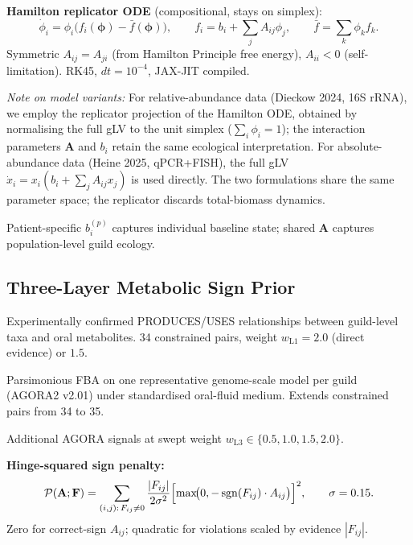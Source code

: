 \documentclass[10pt,a4paper]{article}
\newcommand{\bphi}{\boldsymbol{\phi}}
\newcommand{\bA}{\mathbf{A}}
\begin{document}
\textbf{Hamilton replicator ODE} (compositional, stays on simplex):
\begin{equation}
  \dot\phi_i = \phi_i\bigl(f_i(\bphi) - \bar f(\bphi)\bigr),
  \qquad f_i = b_i + \textstyle\sum_j A_{ij}\phi_j,
  \qquad \bar f = \textstyle\sum_k \phi_k f_k.
\end{equation}
Symmetric $A_{ij}=A_{ji}$ (from Hamilton Principle free energy),
$A_{ii}<0$ (self-limitation). RK45, $dt=10^{-4}$, JAX-JIT compiled.

\textit{Note on model variants:} For relative-abundance data (Dieckow 2024, 16S rRNA),
we employ the replicator projection of the Hamilton ODE, obtained by normalising the
full gLV to the unit simplex ($\sum_i\phi_i=1$); the interaction parameters $\bA$ and
$b_i$ retain the same ecological interpretation.
For absolute-abundance data (Heine 2025, qPCR+FISH), the full gLV
$\dot x_i = x_i(b_i+\sum_j A_{ij}x_j)$ is used directly.
The two formulations share the same parameter space; the replicator discards total-biomass dynamics.

Patient-specific $b_i^{(p)}$ captures individual baseline state;
shared $\bA$ captures population-level guild ecology.

\subsection{Three-Layer Metabolic Sign Prior}

\begin{description}[noitemsep]
  \item[L1 --- eHOMD/Szafra\'{n}ski:] Experimentally confirmed PRODUCES/USES
        relationships between guild-level taxa and oral metabolites.
        34 constrained pairs, weight $w_\text{L1}=2.0$ (direct evidence) or $1.5$.
  \item[L2 --- AGORA2 pFBA:] Parsimonious FBA on one representative genome-scale
        model per guild (AGORA2 v2.01) under standardised oral-fluid medium.
        Extends constrained pairs from 34 to 35.
  \item[L3 --- AGORA weight sweep:] Additional AGORA signals at swept weight
        $w_\text{L3} \in \{0.5, 1.0, 1.5, 2.0\}$.
\end{description}

\textbf{Hinge-squared sign penalty:}
\begin{equation}
  \mathcal{P}(\bA;\mathbf{F}) = \sum_{(i,j):\,F_{ij}\neq 0}
    \frac{|F_{ij}|}{2\sigma^2}
    \Bigl[\max\!\bigl(0,-\operatorname{sgn}(F_{ij})\cdot A_{ij}\bigr)\Bigr]^2,
  \qquad \sigma = 0.15.
\end{equation}
Zero for correct-sign $A_{ij}$; quadratic for violations scaled by evidence $|F_{ij}|$.
\end{document}
